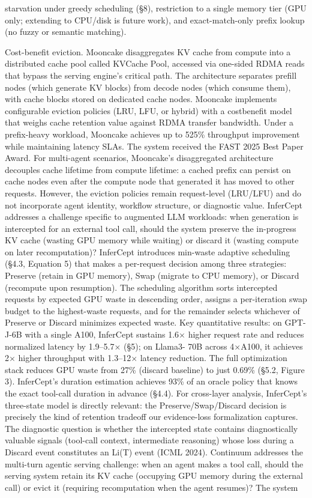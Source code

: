 \documentclass[preprint,12pt]{elsarticle}
\begin{document}
starvation under greedy scheduling (\S{}8), restriction to a single memory tier (GPU only; extending to CPU/disk is future work), and exact-match-only prefix lookup (no fuzzy or semantic matching).


Cost-benefit eviction. Mooncake \cite{v5ref32} disaggregates KV cache from compute into a distributed cache pool called KVCache Pool, accessed via one-sided RDMA reads that bypass the serving engine's critical path. The architecture separates prefill nodes (which generate KV blocks) from decode nodes (which consume them), with cache blocks stored on dedicated cache nodes. Mooncake implements configurable eviction policies (LRU, LFU, or hybrid) with a costbenefit model that weighs cache retention value against RDMA transfer bandwidth. Under a prefix-heavy workload, Mooncake achieves up to 525\% throughput improvement while maintaining latency SLAs. The system received the FAST 2025 Best Paper Award. For multi-agent scenarios, Mooncake's disaggregated architecture decouples cache lifetime from compute lifetime: a cached prefix can persist on cache nodes even after the compute node that generated it has moved to other requests. However, the eviction policies remain request-level (LRU/LFU) and do not incorporate agent identity, workflow structure, or diagnostic value. InferCept \cite{v5ref1} addresses a challenge specific to augmented LLM workloads: when generation is intercepted for an external tool call, should the system preserve the in-progress KV cache (wasting GPU memory while waiting) or discard it (wasting compute on later recomputation)? InferCept introduces min-waste adaptive scheduling (\S{}4.3, Equation 5) that makes a per-request decision among three strategies: Preserve (retain in GPU memory), Swap (migrate to CPU memory), or Discard (recompute upon resumption). The scheduling algorithm sorts intercepted requests by expected GPU waste in descending order, assigns a per-iteration swap budget to the highest-waste requests, and for the remainder selects whichever of Preserve or Discard minimizes expected waste. Key quantitative results: on GPT-J-6B with a single A100, InferCept sustains 1.6$\times$ higher request rate and reduces normalized latency by 1.9--5.7$\times$ (\S{}5); on Llama3- 70B across 4$\times$A100, it achieves 2$\times$ higher throughput with 1.3--12$\times$ latency reduction. The full optimization stack reduces GPU waste from 27\% (discard baseline) to just 0.69\% (\S{}5.2, Figure 3). InferCept's duration estimation achieves 93\% of an oracle policy that knows the exact tool-call duration in advance (\S{}4.4). For cross-layer analysis, InferCept's three-state model is directly relevant: the Preserve/Swap/Discard decision is precisely the kind of retention tradeoff our evidence-loss formalization captures. The diagnostic question is whether the intercepted state contains diagnostically valuable signals (tool-call context, intermediate reasoning) whose loss during a Discard event constitutes an Li(T) event (ICML 2024). Continuum \cite{v5ref16} addresses the multi-turn agentic serving challenge: when an agent makes a tool call, should the serving system retain its KV cache (occupying GPU memory during the external call) or evict it (requiring recomputation when the agent resumes)? The system 
\end{document}
